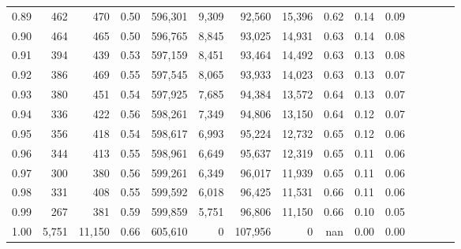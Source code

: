 \begin{tabular}{rrrcrrrrrrrrrrr}
0.89 &     462 &     470 &                                       0.50 &  596,301 &    9,309 &   92,560 &   15,396 &  0.62 &  0.14 &                         0.09 \\
0.90 &     464 &     465 &                                       0.50 &  596,765 &    8,845 &   93,025 &   14,931 &  0.63 &  0.14 &                         0.08 \\
0.91 &     394 &     439 &                                       0.53 &  597,159 &    8,451 &   93,464 &   14,492 &  0.63 &  0.13 &                         0.08 \\
0.92 &     386 &     469 &                                       0.55 &  597,545 &    8,065 &   93,933 &   14,023 &  0.63 &  0.13 &                         0.07 \\
0.93 &     380 &     451 &                                       0.54 &  597,925 &    7,685 &   94,384 &   13,572 &  0.64 &  0.13 &                         0.07 \\
0.94 &     336 &     422 &                                       0.56 &  598,261 &    7,349 &   94,806 &   13,150 &  0.64 &  0.12 &                         0.07 \\
0.95 &     356 &     418 &                                       0.54 &  598,617 &    6,993 &   95,224 &   12,732 &  0.65 &  0.12 &                         0.06 \\
0.96 &     344 &     413 &                                       0.55 &  598,961 &    6,649 &   95,637 &   12,319 &  0.65 &  0.11 &                         0.06 \\
0.97 &     300 &     380 &                                       0.56 &  599,261 &    6,349 &   96,017 &   11,939 &  0.65 &  0.11 &                         0.06 \\
0.98 &     331 &     408 &                                       0.55 &  599,592 &    6,018 &   96,425 &   11,531 &  0.66 &  0.11 &                         0.06 \\
0.99 &     267 &     381 &                                       0.59 &  599,859 &    5,751 &   96,806 &   11,150 &  0.66 &  0.10 &                         0.05 \\
1.00 &   5,751 &  11,150 &                                       0.66 &  605,610 &        0 &  107,956 &        0 &   nan &  0.00 &                         0.00 \\
\bottomrule
\end{tabular}

